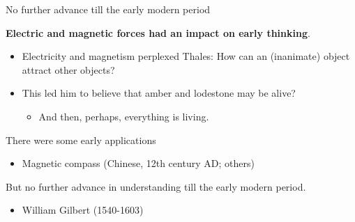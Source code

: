 \begin{frame}{No further advance till the early modern period}

{\bf Electric and magnetic forces had an impact on early thinking}.\\
\begin{itemize}
   \item Electricity and magnetism perplexed Thales: How can an (inanimate) object attract other objects?
   \item This led him to believe that amber and lodestone may be alive?
     \begin{itemize}
        \item And then, perhaps, everything is living.\\
     \end{itemize}
\end{itemize}

\vspace{0.3cm}

There were some early applications
\begin{itemize}
   \item Magnetic compass (Chinese, 12th century AD; others)
\end{itemize}

\vspace{0.3cm}

But no further advance in understanding till the early modern period.
\begin{itemize}
    \item William Gilbert (1540-1603)
\end{itemize}

\end{frame}

%
%
%

